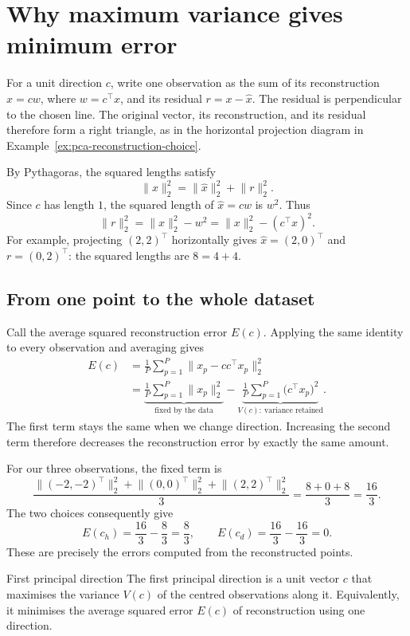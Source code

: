 \documentclass[a4paper,12pt,oneside]{report}
\begin{document}
\clearpage
\section{Why maximum variance gives minimum error}

For a unit direction $c$, write one observation as the sum of its
reconstruction $\hat{x}=cw$, where $w=c^\top x$, and its residual
$r=x-\hat{x}$. The residual is perpendicular to the chosen line.
The original vector, its reconstruction, and its residual therefore
form a right triangle, as in the horizontal projection diagram in
Example~\ref{ex:pca-reconstruction-choice}.

By Pythagoras, the squared lengths satisfy
\[
  \lVert x\rVert_2^2=\lVert\hat{x}\rVert_2^2+\lVert r\rVert_2^2.
\]
Since $c$ has length $1$, the squared length of $\hat{x}=cw$ is
$w^2$. Thus
\[
  \lVert r\rVert_2^2=\lVert x\rVert_2^2-w^2
                   =\lVert x\rVert_2^2-(c^\top x)^2.
\]
For example, projecting $(2,2)^\top$ horizontally gives
$\hat{x}=(2,0)^\top$ and $r=(0,2)^\top$: the squared lengths are
$8=4+4$.

\subsection{From one point to the whole dataset}

Call the average squared reconstruction error $E(c)$. Applying the
same identity to every observation and averaging gives
\[
\begin{aligned}
  E(c)
    &=\frac1P\sum_{p=1}^{P}
        \lVert x_p-cc^\top x_p\rVert_2^2 \\
    &=\underbrace{\frac1P\sum_{p=1}^{P}
        \lVert x_p\rVert_2^2}_{\text{fixed by the data}}
      -\underbrace{\frac1P\sum_{p=1}^{P}
        \bigl(c^\top x_p\bigr)^2}_{V(c):\ \text{variance retained}}.
\end{aligned}
\]
The first term stays the same when we change direction. Increasing
the second term therefore decreases the reconstruction error by
exactly the same amount.

For our three observations, the fixed term is
\[
  \frac{\lVert(-2,-2)^\top\rVert_2^2+\lVert(0,0)^\top\rVert_2^2
        +\lVert(2,2)^\top\rVert_2^2}{3}
  =\frac{8+0+8}{3}=\frac{16}{3}.
\]
The two choices consequently give
\[
  E(c_h)=\frac{16}{3}-\frac83=\frac83,\qquad
  E(c_d)=\frac{16}{3}-\frac{16}{3}=0.
\]
These are precisely the errors computed from the reconstructed points.

\enlargethispage{\baselineskip}
\begin{frameddefn}{First principal direction}\label{def:pca-first-direction}
The first principal direction is a unit vector $c$ that maximises
the variance $V(c)$ of the centred observations along it.
Equivalently, it minimises the average squared error $E(c)$ of
reconstruction using one direction.
\end{frameddefn}
\end{document}
